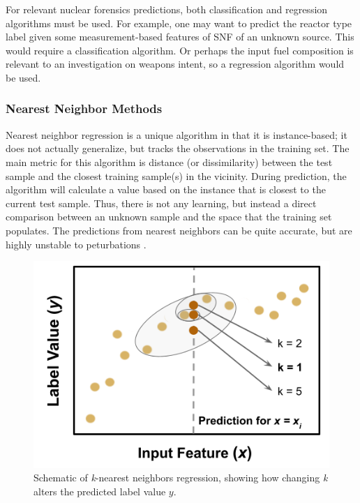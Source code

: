 \setlength\abovedisplayskip{2.5pt}

For relevant nuclear forensics predictions, both classification and regression
algorithms must be used.  For example, one may want to predict the reactor type
label given some measurement-based features of \gls{SNF} of an unknown source.
This would require a classification algorithm. Or perhaps the input fuel
composition is relevant to an investigation on weapons intent, so a regression
algorithm would be used. 

\subsubsection{Nearest Neighbor Methods}

Nearest neighbor regression is a unique algorithm in that it is instance-based;
it does not actually generalize, but tracks the observations in the training
set.  The main metric for this algorithm is distance (or dissimilarity) between
the test sample and the closest training sample(s) in the vicinity.  During
prediction, the algorithm will calculate a value based on the instance that is
closest to the current test sample. Thus, there is not any learning, but
instead a direct comparison between an unknown sample and the space that the
training set populates. The predictions from nearest neighbors can be quite
accurate, but are highly unstable to peturbations \cite{elements_stats}.

\begin{figure}[!htb]
  \centering
  \includegraphics[width=0.8\linewidth]{./chapters/litrev/nn-fig.png}
  \caption{Schematic of \textit{k}-nearest neighbors regression, showing how 
           changing \textit{k} alters the predicted label value $y$.}
  \label{fig:nn}
\end{figure}

